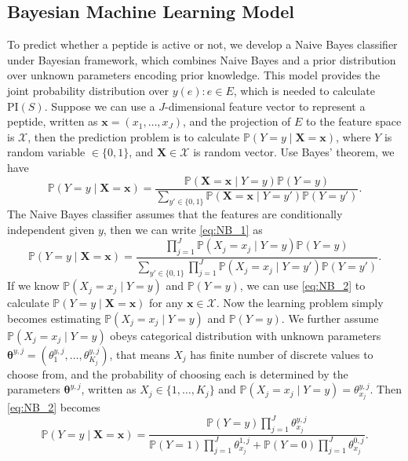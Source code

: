 \documentclass[11pt]{article}
\newcommand{\Prob}{\mathbb{P}}
\newcommand{\PI}{\text{PI}}
\begin{document}
\subsection{Bayesian Machine Learning Model} \label{sec:stat model}
To predict whether a peptide is active or not, we develop a Naive Bayes classifier 
under Bayesian framework, which combines Naive Bayes and a prior distribution over
unknown parameters encoding prior knowledge. This model provides the joint probability
distribution over $y(e): e \in E$, which is needed to calculate $\PI(S)$. Suppose we 
can use a $J$-dimensional feature vector to represent a peptide, written as
$\bm{x} = (x_1, \ldots, x_J)$, and the projection of $E$ to the feature space is
$\mathcal{X}$, then the prediction problem is to calculate
$\Prob (Y = y \mid \bm{X} = \bm{x})$, where $Y$ is random variable $\in \{0, 1\}$,
and $\bm{X} \in \mathcal{X}$ is random vector. Use Bayes' theorem, we have
\begin{equation}
  \Prob(Y = y \mid \bm{X} = \bm{x}) = \frac{\Prob(\bm{X} = \bm{x} \mid Y = y) \Prob(Y = y)}{\sum_{y' \in \{0, 1\}} \Prob(\bm{X}= \bm{x} \mid Y = y') \Prob(Y = y')}.
  \label{eq:NB_1}
\end{equation}
The Naive Bayes classifier assumes that the features are conditionally independent 
given $y$, then we can write \eqref{eq:NB_1} as 
\begin{equation}
  \Prob(Y = y \mid \bm{X} = \bm{x}) = \frac{\prod_{j = 1}^J \Prob(X_j = x_j \mid Y = y) \Prob(Y = y)}{\sum_{y' \in \{0, 1\}} \prod_{j = 1}^J \Prob(X_j = x_j \mid Y = y') \Prob(Y = y')}.
  \label{eq:NB_2}
\end{equation}
If we know $\Prob(X_j = x_j \mid Y = y)$ and $\Prob(Y = y)$, we can use \eqref{eq:NB_2} 
to calculate $\Prob(Y = y \mid \bm{X} = \bm{x})$ for any $\bm{x} \in \mathcal{X}$. Now the learning
problem simply becomes estimating $\Prob(X_j = x_j \mid Y = y)$ and $\Prob(Y = y)$.
We further assume $\Prob(X_j = x_j \mid Y = y)$ obeys categorical distribution with
unknown parameters $\bm{\theta}^{y, j} = (\theta^{y, j}_1, \ldots, \theta^{y, j}_{K_j})$,
that means $X_j$ has finite number of discrete values to choose from, and the probability
of choosing each is determined by the parameters $\bm{\theta}^{y, j}$, written as
$X_j \in \{1, \ldots, K_j\}$ and $\Prob(X_j = x_j \mid Y = y) = \theta^{y, j}_{x_j}$.
Then \eqref{eq:NB_2} becomes
\begin{equation}
  \Prob (Y = y \mid \bm{X} = \bm{x}) = \frac{\Prob(Y = y) \prod_{j=1}^J \theta^{y, j}_{x_j}}
  {\Prob(Y = 1) \prod_{j=1}^J \theta^{1,j}_{x_j} + \Prob(Y = 0) \prod_{j=1}^J \theta^{0,j}_{x_j}}.
  \label{eq:NB_3}
\end{equation}
\end{document}

